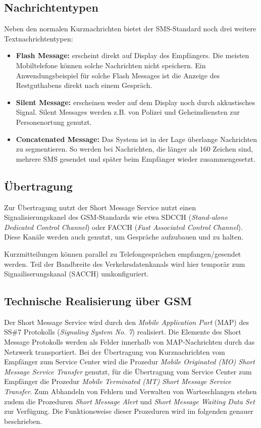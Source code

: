 \documentclass[german,12pt,a4paper]{article}
\begin{document}
\subsection{Nachrichtentypen}
Neben den normalen Kurznachrichten bietet der SMS-Standard noch drei weitere Textnachrichtentypen:
\begin{itemize}
	\item \textbf{Flash Message:} erscheint direkt auf Display des Empfängers. Die meisten Mobiltelefone 
        können solche Nachrichten nicht speichern. Ein Anwendungsbeispiel für solche Flash Messages ist die 
        Anzeige des Restguthabens direkt nach einem Gespräch.
	\item \textbf{Silent Message:} erscheinen weder auf dem Display noch durch akkustisches Signal. 
		Silent Messages werden z.B. von Polizei und Geheimdiensten zur Personenortung genutzt.
	\item \textbf{Concatenated Message:} Das System ist in der Lage überlange 
Nachrichten zu segmentieren. So werden bei Nachrichten, die länger als 160 Zeichen 
sind, mehrere SMS gesendet und später beim Empfänger wieder zusammengesetzt.
\end{itemize}

\subsection{Übertragung}
Zur Übertragung nutzt der Short Message Service nutzt einen Signalisierungskanel des GSM-Standards wie etwa SDCCH 
(\textit{Stand-alone Dedicated Control Channel}) oder FACCH (\textit{Fast Associated Control Channel}). 
Diese Kanäle werden auch genutzt, um Gespräche aufzubauen und zu halten.

Kurzmitteilungen können parallel zu Telefongesprächen empfangen/gesendet werden. Teil der Bandbreite des 
Verkehrsdatenkanals wird hier temporär zum Signailiserungskanal (SACCH) umkonfiguriert.


\subsection{Technische Realisierung über GSM}
Der Short Message Service wird durch den \textit{Mobile Application Part} (MAP) des SS\#7 Protokolls (\textit{Signaling 
System No. 7}) realisiert. Die Elemente des Short Message Protokolls werden als Felder innerhalb von 
MAP-Nachrichten durch das Netzwerk transportiert. Bei der Übertragung von Kurznachrichten vom Empfänger zum
Service Center wird die Prozedur \textit{Mobile Originated (MO) Short Message Service Transfer} genutzt,
für die Übertragung vom Service Center zum Empfänger die Prozedur \textit{Mobile Terminated (MT) Short
Message Service Transfer}. Zum Abhandeln von Fehlern und Verwalten von Warteschlangen stehen zudem die 
Prozeduren \textit{Short Message Alert} und \textit{Short Message Waiting Data Set} 
zur Verfügung. Die Funktionsweise dieser Prozeduren wird im folgenden genauer beschrieben.
\end{document}
